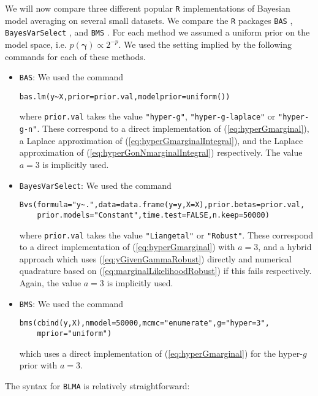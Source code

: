 \documentclass[12pt]{article}
\def\vectorfonttwo{\boldsymbol}
\def\vgamma{{\vectorfonttwo \gamma}}             %
\begin{document}
We will now compare three different popular {\tt R} implementations of Bayesian model averaging on 
several small datasets. We compare the {\tt R} packages {\tt BAS} \citep{Clyde2017}, 
{\tt BayesVarSelect} \citep{Garcia-Donato2016}, and  {\tt BMS} \citep{Zeugner2015}. For each method
we assumed a uniform prior on the model space, i.e. $p(\vgamma)\propto 2^{-p}$. We used the
setting implied by the following commands for each of these methods.
\begin{itemize}
	\item {\tt BAS}: We used the command
\begin{verbatim}
bas.lm(y~X,prior=prior.val,modelprior=uniform())
\end{verbatim}

	where \verb|prior.val| takes the value \verb|"hyper-g"|, \verb|"hyper-g-laplace"| or \verb|"hyper-g-n"|.
	These correspond to a direct implementation of (\ref{eq:hyperGmarginal}),
	a Laplace approximation of (\ref{eq:hyperGmarginalIntegral}), and the 
	Laplace approximation of (\ref{eq:hyperGonNmarginalIntegral}) respectively. The
	value $a=3$ is implicitly used.
	
	\item {\tt BayesVarSelect}: We used the command
\begin{verbatim}
Bvs(formula="y~.",data=data.frame(y=y,X=X),prior.betas=prior.val,
    prior.models="Constant",time.test=FALSE,n.keep=50000)
\end{verbatim}

    
\noindent where \verb|prior.val| takes the value \verb|"Liangetal"| or \verb|"Robust"|.
These 
correspond to a direct implementation of (\ref{eq:hyperGmarginal}) with $a=3$, and a hybrid approach which
uses (\ref{eq:yGivenGammaRobust}) directly and numerical quadrature based on (\ref{eq:marginalLikelihoodRobust}) if this fails respectively. 
Again, the value
$a=3$ is implicitly used.
 
\item {\tt BMS}: We used the command
\begin{verbatim}
bms(cbind(y,X),nmodel=50000,mcmc="enumerate",g="hyper=3",
    mprior="uniform")	
\end{verbatim}

\noindent which uses a direct implementation of (\ref{eq:hyperGmarginal}) for the hyper-$g$
prior with $a=3$.
\end{itemize}

\noindent 
The syntax for {\tt BLMA} is relatively straightforward:
\end{document}
